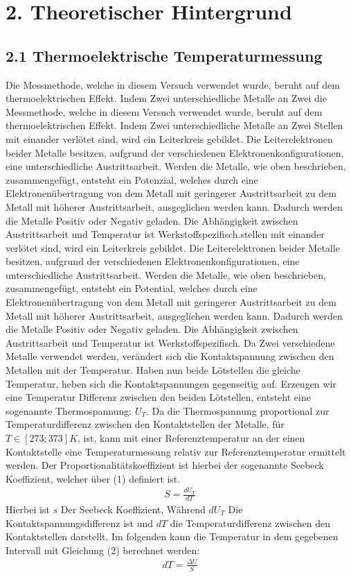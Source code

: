 \documentclass[a4paper]{article}
\begin{document}
\section*{2. Theoretischer Hintergrund}
\subsection*{2.1 Thermoelektrische Temperaturmessung}
Die Messmethode, welche in diesem Versuch verwendet wurde, beruht auf dem thermoelektrischen Effekt. Indem Zwei unterschiedliche Metalle an Zwei die Messmethode, welche in diesem Versuch verwendet wurde, beruht auf dem thermoelektrischen Effekt. Indem Zwei unterschiedliche Metalle an Zwei Stellen mit einander verlötet sind, wird ein Leiterkreis gebildet. Die Leiterelektronen beider Metalle besitzen, aufgrund der verschiedenen Elektronenkonfigurationen, eine unterschiedliche Austrittsarbeit. Werden die Metalle, wie oben beschrieben, zusammengefügt, entsteht ein Potenzial, welches durch eine Elektronenübertragung von dem Metall mit geringerer Austrittsarbeit zu dem Metall mit höherer Austrittsarbeit, ausgeglichen werden kann. Dadurch werden die Metalle Positiv oder Negativ geladen. Die Abhängigkeit zwischen Austrittsarbeit und Temperatur ist Werkstoffspezifisch.stellen mit einander verlötet sind, wird ein Leiterkreis gebildet. Die Leiterelektronen beider Metalle besitzen, aufgrund der verschiedenen Elektronenkonfigurationen, eine unterschiedliche Austrittsarbeit. Werden die Metalle, wie oben beschrieben, zusammengefügt, entsteht ein Potential, welches durch eine Elektronenübertragung von dem Metall mit geringerer Austrittsarbeit zu dem Metall mit höherer Austrittsarbeit, ausgeglichen werden kann. Dadurch werden die Metalle Positiv oder Negativ geladen. Die Abhängigkeit zwischen Austrittsarbeit und Temperatur ist Werkstoffspezifisch. Da Zwei verschiedene Metalle verwendet werden, verändert sich die Kontaktspannung zwischen den Metallen mit der Temperatur. Haben nun beide Lötstellen die gleiche Temperatur, heben sich die Kontaktspannungen gegenseitig auf. Erzeugen wir eine Temperatur Differenz zwischen den beiden Lötstellen, entsteht eine sogenannte Thermospannung: $U_T$. Da die Thermospannung proportional zur Temperaturdifferenz zwischen den Kontaktstellen der Metalle, für $T\in [273;373]K$, ist, kann mit einer Referenztemperatur an der einen Kontaktstelle eine Temperaturmessung relativ zur Referenztemperatur ermittelt werden. Der Proportionalitätskoeffizient ist hierbei der sogenannte Seebeck Koeffizient, welcher über (1) definiert ist. 
\begin{align}  
S = \frac{dU_T}{dT}
\end{align}
Hierbei ist $s$ Der Seebeck Koeffizient, Während $dU_T$ Die Kontaktspannungsdifferenz ist und $dT$ die Temperaturdifferenz zwischen den Kontaktstellen darstellt. Im folgenden kann die Temperatur in dem gegebenen Intervall mit Gleichung (2) berechnet werden:
\begin{align}
dT=\frac{\Delta U}{S}
\end{align}
\end{document}
